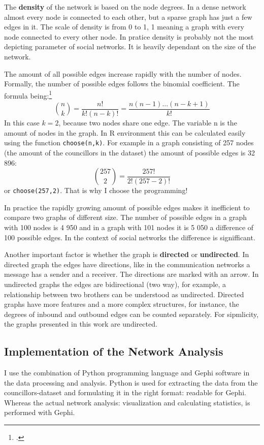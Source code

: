 The \textbf{density} of the network is based on the node degrees. In a dense network almost every node is connected to each other, but a sparse graph has just a few edges in it. The scale of density is from 0 to 1, 1 meaning a graph with every node connected to every other node. In pratice density is probably not the most depicting parameter of social networks. It is heavily dependant on the size of the network. 

The amount of all possible edges increase rapidly with the number of nodes. Formally, the number of possible edges follows the binomial coefficient. The formula being:\footcite[p. 16.]{laininen2002}
\begin{equation*}
\binom{n}{k} = \frac{n!}{k!(n-k)!} = \frac{n(n-1)...(n-k+1)}{k!}
\end{equation*}
In this case $k = 2$, because two nodes share one edge. The variable n is the amount of nodes in the graph. In R environment this can be calculated easily using the function \texttt{choose(n,k)}. For example in a graph consisting of 257 nodes (the amount of the councillors in the dataset) the amount of possible edges is 32 896:
\begin{equation*}
\binom{257}{2} = \frac{257!}{2!(257-2)!}
\end{equation*}
or \texttt{choose(257,2)}. That is why I choose the programming!

In practice the rapidly growing amount of possible edges makes it inefficient to compare two graphs of different size. The number of possible edges in a graph with 100 nodes is 4 950 and in a graph with 101 nodes it is 5 050 a difference of 100 possible edges. In the context of social networks the difference is signifficant.

Another important factor is whether the graph is \textbf{directed} or \textbf{undirected}. In directed graph the edges have directions, like in the communication networks a message has a sender and a receiver. The directions are marked with an arrow. In undirected graphs the edges are bidirectional (two way), for example, a relationship between two brothers can be understood as undirected. Directed graphs have more features and a more complex structures, for instance, the degrees of inbound and outbound edges can be counted separately. For sipmlicity, the graphs presented in this work are undirected.

\subsection{Implementation of the Network Analysis}
I use the combination of Python programming language and Gephi software in the data processing and analysis. Python is used for extracting the data from the councillors-dataset and formulating it in the right format: readable for Gephi. Whereas the actual network analysis: visualization and calculating statistics, is performed with Gephi. 

